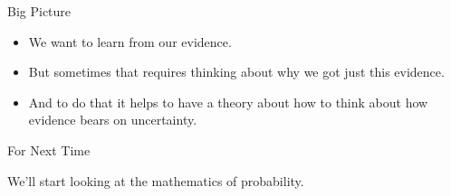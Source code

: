 \documentclass[
  ignorenonframetext,
]{beamer}
\providecommand{\tightlist}{%
  \setlength{\itemsep}{0pt}\setlength{\parskip}{0pt}}
\renewcommand{\,}{\text{, }}
\begin{document}
\begin{frame}{Big Picture}
\protect\hypertarget{big-picture}{}

\begin{itemize}
\tightlist
\item
  We want to learn from our evidence.
\item
  But sometimes that requires thinking about why we got just this
  evidence.
\item
  And to do that it helps to have a theory about how to think about how
  evidence bears on uncertainty.
\end{itemize}

\end{frame}

\begin{frame}{For Next Time}
\protect\hypertarget{for-next-time}{}

We'll start looking at the mathematics of probability.

\end{frame}
\end{document}
